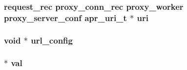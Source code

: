 \subsubsection[{\texorpdfstring{uri}{uri}}]{ {\bf request\+\_\+rec} {\bf proxy\+\_\+conn\+\_\+rec} {\bf proxy\+\_\+worker} {\bf proxy\+\_\+server\+\_\+conf} {\bf apr\+\_\+uri\+\_\+t} $\ast$ uri}\hypertarget{group__APACHE__CORE__HTTPD_gaaf802cf1817bf45bcf1a5f266ef18bbd}{}\label{group__APACHE__CORE__HTTPD_gaaf802cf1817bf45bcf1a5f266ef18bbd}
\subsubsection[{\texorpdfstring{url\+\_\+config}{url_config}}]{ {\bf void} $\ast$ url\+\_\+config}\hypertarget{group__APACHE__CORE__HTTPD_ga055528560a866ebb58a84ff7eaf9ea1f}{}\label{group__APACHE__CORE__HTTPD_ga055528560a866ebb58a84ff7eaf9ea1f}
\subsubsection[{\texorpdfstring{val}{val}}]{$\ast$ val}\hypertarget{group__APACHE__CORE__HTTPD_gab03f36f103bdec81305fd301f1f93885}{}\label{group__APACHE__CORE__HTTPD_gab03f36f103bdec81305fd301f1f93885}
